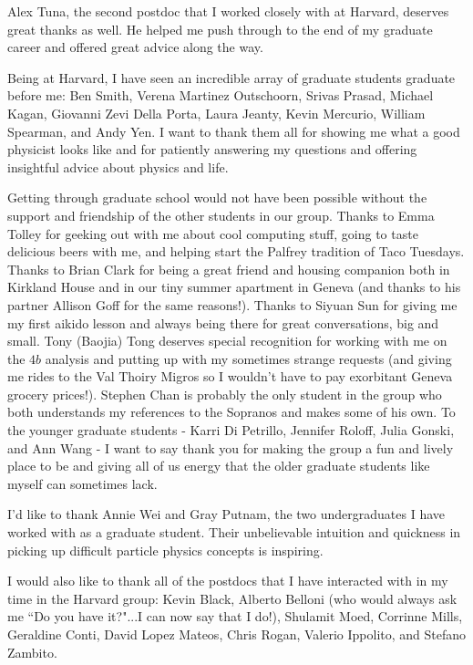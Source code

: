 \begin{doublespace}
Alex Tuna, the second postdoc that I worked closely with at Harvard, deserves great thanks as well. He helped me push through to the end of my graduate career and offered great advice along the way. 

Being at Harvard, I have seen an incredible array of graduate students graduate before me: Ben Smith, Verena Martinez Outschoorn, Srivas Prasad, Michael Kagan, Giovanni Zevi Della Porta, Laura Jeanty, Kevin Mercurio, William Spearman, and Andy Yen. I want to thank them all for showing me what a good physicist looks like and for patiently answering my questions and offering insightful advice about physics and life. 

Getting through graduate school would not have been possible without the support and friendship of the other students in our group. Thanks to Emma Tolley for geeking out with me about cool computing stuff, going to taste delicious beers with me, and helping start the Palfrey tradition of Taco Tuesdays. Thanks to Brian Clark for being a great friend and housing companion both in Kirkland House and in our tiny summer apartment in Geneva (and thanks to his partner Allison Goff for the same reasons!). Thanks to Siyuan Sun for giving me my first aikido lesson and always being there for great conversations, big and small. Tony (Baojia) Tong deserves special recognition for working with me on the $4b$ analysis and putting up with my sometimes strange requests (and giving me rides to the Val Thoiry Migros so I wouldn't have to pay exorbitant Geneva grocery prices!). Stephen Chan is probably the only student in the group who both understands my references to the Sopranos and makes some of his own. To the younger graduate students - Karri Di Petrillo, Jennifer Roloff, Julia Gonski, and Ann Wang - I want to say thank you for making the group a fun and lively place to be and giving all of us energy that the older graduate students like myself can sometimes lack. 

I'd like to thank Annie Wei and Gray Putnam, the two undergraduates I have worked with as a graduate student. Their unbelievable intuition and quickness in picking up difficult particle physics concepts is inspiring. 

I would also like to thank all of the postdocs that I have interacted with in my time in the Harvard group: Kevin Black, Alberto Belloni (who would always ask me ``Do you have it?"...I can now say that I do!), Shulamit Moed, Corrinne Mills, Geraldine Conti, David Lopez Mateos, Chris Rogan, Valerio Ippolito, and Stefano Zambito. 


\end{doublespace}
